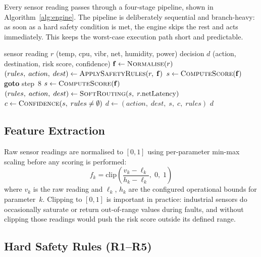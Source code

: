 \documentclass[conference]{IEEEtran}
\begin{document}
Every sensor reading passes through a four-stage pipeline, shown in
Algorithm~\ref{alg:engine}.
The pipeline is deliberately sequential and branch-heavy: as soon as
a hard safety condition is met, the engine skips the rest and
acts immediately.
This keeps the worst-case execution path short and predictable.

\begin{algorithm}[t]
\caption{FogAI Decision Pipeline (per sensor cycle)}
\label{alg:engine}
\begin{algorithmic}[1]
\REQUIRE sensor reading $r$ (temp, cpu, vibr, net, humidity, power)
\ENSURE  decision $d$ (action, destination, risk score, confidence)
\STATE $\mathbf{f} \leftarrow \textsc{Normalise}(r)$
\STATE $(rules,\;action,\;dest) \leftarrow
  \textsc{ApplySafetyRules}(r,\;\mathbf{f})$
  \STATE $s \leftarrow \textsc{ComputeScore}(\mathbf{f})$
  \STATE \textbf{goto} step~8
\ENDIF
\STATE $s \leftarrow \textsc{ComputeScore}(\mathbf{f})$
\STATE $(rules,\;action,\;dest)
  \leftarrow \textsc{SoftRouting}(s,\;r.\text{netLatency})$
\STATE $c \leftarrow \textsc{Confidence}(s,\;rules \neq \emptyset)$
\STATE $d \leftarrow (action,\;dest,\;s,\;c,\;rules)$
\RETURN $d$
\end{algorithmic}
\end{algorithm}

\subsection{Feature Extraction}

Raw sensor readings are normalised to $[0,1]$ using per-parameter
min-max scaling before any scoring is performed:
\begin{equation}
  f_k = \text{clip}\!\left(
    \frac{v_k - \ell_k}{h_k - \ell_k},\; 0,\; 1
  \right)
  \label{eq:norm}
\end{equation}
where $v_k$ is the raw reading and $\ell_k$, $h_k$ are the configured
operational bounds for parameter~$k$.
Clipping to $[0,1]$ is important in practice: industrial sensors do
occasionally saturate or return out-of-range values during faults,
and without clipping those readings would push the risk score outside
its defined range.

\subsection{Hard Safety Rules (R1--R5)}
\end{document}
